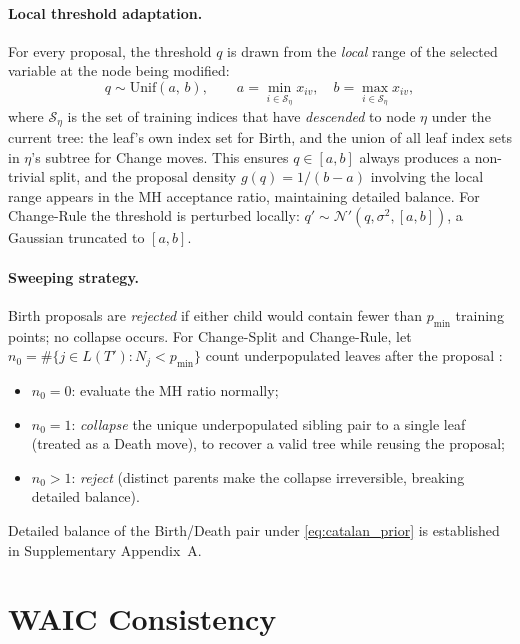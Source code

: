 \documentclass[ba]{imsart}
\theoremstyle{plain}
\theoremstyle{definition}
\theoremstyle{remark}
\begin{document}
\paragraph{Local threshold adaptation.}
For every proposal, the threshold $q$ is drawn from the \emph{local} range of the
selected variable at the node being modified:
\begin{equation}
  q \sim \mathrm{Unif}(a,\,b), \qquad
  a = \min_{i \in \mathcal{S}_\eta} x_{iv},\quad
  b = \max_{i \in \mathcal{S}_\eta} x_{iv},
  \label{eq:local_q}
\end{equation}
where $\mathcal{S}_\eta$ is the set of training indices that have \emph{descended} to
node $\eta$ under the current tree: the leaf's own index set for Birth, and the
union of all leaf index sets in $\eta$'s subtree for Change moves.
This ensures $q \in [a,b]$ always produces a non-trivial split, and the
proposal density $g(q) = 1/(b-a)$ involving the local range appears in the
MH acceptance ratio, maintaining detailed balance.
For Change-Rule the threshold is perturbed locally:
$q' \sim \mathcal{N}'(q,\sigma^2,[a,b])$, a Gaussian truncated to $[a,b]$.

\paragraph{Sweeping strategy.}
Birth proposals are \emph{rejected} if either child would contain fewer than
$p_{\min}$ training points; no collapse occurs.
For Change-Split and Change-Rule, let
$n_0 = \#\{j \in L(T') : N_j < p_{\min}\}$ count underpopulated leaves after
the proposal \citep{schetinin2025}:
\begin{itemize}
  \item $n_0 = 0$: evaluate the MH ratio normally;
  \item $n_0 = 1$: \emph{collapse} the unique underpopulated sibling pair to
        a single leaf (treated as a Death move), to recover a valid tree
        while reusing the proposal;
  \item $n_0 > 1$: \emph{reject} (distinct parents make the collapse
        irreversible, breaking detailed balance).
\end{itemize}
Detailed balance of the Birth/Death pair under \eqref{eq:catalan_prior}
is established in Supplementary Appendix~A.

\section{WAIC Consistency}
\label{sec:waic}
\end{document}
